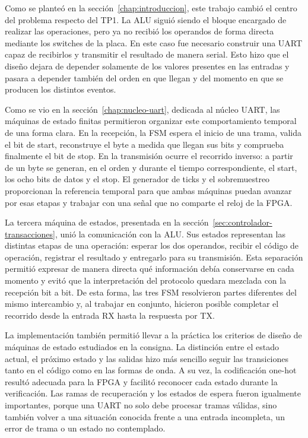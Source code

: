 Como se planteó en la sección~\ref{chap:introduccion}, este trabajo
cambió el centro del problema respecto del TP1. La ALU siguió siendo
el bloque encargado de realizar las operaciones, pero ya no recibió
los operandos de forma directa mediante los switches de la placa. En
este caso fue necesario construir una UART capaz de recibirlos y
transmitir el resultado de manera serial. Esto hizo que el diseño
dejara de depender solamente de los valores presentes en las entradas
y pasara a depender también del orden en que llegan y del momento en
que se producen los distintos eventos.

Como se vio en la sección~\ref{chap:nucleo-uart}, dedicada al núcleo
UART, las máquinas de estado finitas permitieron organizar este
comportamiento temporal de una forma clara. En la recepción, la FSM
espera el inicio de una trama, valida el bit de start, reconstruye el
byte a medida que llegan sus bits y comprueba finalmente el bit de
stop. En la transmisión ocurre el recorrido inverso: a partir de un
byte se generan, en el orden y durante el tiempo correspondiente, el
start, los ocho bits de datos y el stop. El generador de ticks y el
sobremuestreo proporcionan la referencia temporal para que ambas
máquinas puedan avanzar por esas etapas y trabajar con una señal que
no comparte el reloj de la FPGA.

La tercera máquina de estados, presentada en la
sección~\ref{sec:controlador-transacciones}, unió la comunicación con
la ALU. Sus estados representan las distintas etapas de una
operación: esperar los dos operandos, recibir el código de operación,
registrar el resultado y entregarlo para su transmisión. Esta
separación permitió expresar de manera directa qué información debía
conservarse en cada momento y evitó que la interpretación del
protocolo quedara mezclada con la recepción bit a bit. De esta forma,
las tres FSM resolvieron partes diferentes del mismo intercambio y,
al trabajar en conjunto, hicieron posible completar el recorrido
desde la entrada RX hasta la respuesta por TX.

La implementación también permitió llevar a la práctica los criterios
de diseño de máquinas de estado estudiados en la consigna. La
distinción entre el estado actual, el próximo estado y las salidas
hizo más sencillo seguir las transiciones tanto en el código como en
las formas de onda. A su vez, la codificación one-hot resultó
adecuada para la FPGA y facilitó reconocer cada estado durante la
verificación. Las ramas de recuperación y los estados de espera
fueron igualmente importantes, porque una UART no solo debe procesar
tramas válidas, sino también volver a una situación conocida frente a
una entrada incompleta, un error de trama o un estado no contemplado.

